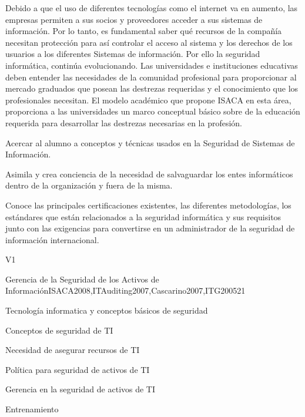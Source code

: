 \begin{syllabus}
\begin{justification}
Debido a que el uso de diferentes tecnologías como el internet va en aumento, las empresas permiten a sus socios y proveedores acceder a sus sistemas de información. Por lo tanto, es fundamental saber qué recursos de la compañía necesitan protección para así­ controlar el acceso al sistema y los derechos de los usuarios a los diferentes Sistemas de información.  Por ello la seguridad informática, continúa evolucionando. Las universidades e instituciones educativas deben entender las necesidades de la comunidad profesional para proporcionar al mercado graduados que posean las destrezas requeridas y el conocimiento que los profesionales necesitan. El modelo académico que propone  ISACA en esta área, proporciona a las universidades un marco conceptual básico sobre de la educación requerida para desarrollar las destrezas necesarias en la profesión.
\end{justification}

\begin{goals}
\item Acercar al alumno a conceptos y técnicas usados en la Seguridad de Sistemas de Información.
\item Asimila y crea conciencia de la necesidad de salvaguardar los entes informáticos dentro de la organización y fuera de la misma.
\item Conoce las principales certificaciones existentes, las diferentes metodologías, los estándares que están relacionados a la seguridad informática y sus requisitos junto con las exigencias para convertirse en un administrador de la seguridad de información internacional.
\end{goals}

\begin{outcomes}{V1}
\end{outcomes}

\begin{unit}{Gerencia de la Seguridad de los Activos de Información}{}{ISACA2008,ITAuditing2007,Cascarino2007,ITG2005}{2}{1}
\begin{topics}
\item Tecnología informatica y conceptos básicos de seguridad
\item Conceptos de seguridad de TI 
\item Necesidad de asegurar recursos de TI
\item Política para seguridad de activos de TI 
\item Gerencia en la seguridad de activos de TI 
\item Entrenamiento
\end{topics}


\end{unit}
\end{syllabus}
